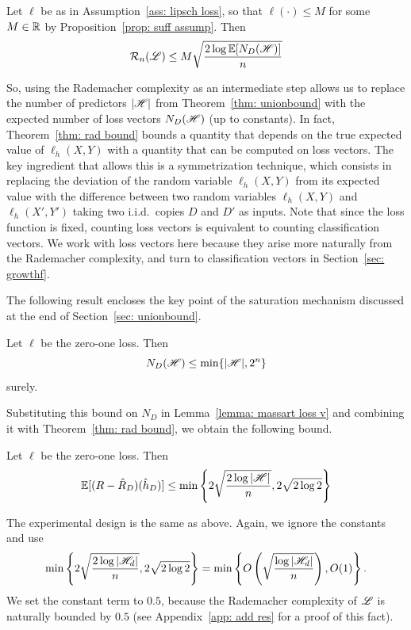 \documentclass[reqno]{amsart}
\begin{document}
\begin{lemma}\label{lemma: massart loss v}
Let $\ell$ be as in Assumption~\ref{ass: lipsch loss}, so that $\ell(\cdot) \le M$ for some $M\in\mathbb{R}$ by Proposition~\ref{prop: suff assump}. Then
\[
\mathcal R_n(\mathscr{L}) \le M\sqrt{\frac{2\log \mathbb{E}[N_D(\mathscr{H})]}{n}}
\]
\end{lemma}

So, using the Rademacher complexity as an intermediate step allows us to replace the number of predictors $\vert\mathscr{H}\vert$ from Theorem~\ref{thm: unionbound} with the expected number of loss vectors $N_D(\mathscr{H})$ (up to constants). 
In fact, Theorem~\ref{thm: rad bound} bounds a quantity that depends on the true expected value of $\ell_h(X,Y)$ with a quantity that can be computed on loss vectors. The key ingredient that allows this is a symmetrization technique, which consists in replacing the deviation of the random variable $\ell_h(X,Y)$ from its expected value with the difference between two random variables $\ell_h(X,Y)$ and $\ell_h(X',Y')$ taking two i.i.d.\ copies $D$ and $D'$ as inputs. Note that since the loss function is fixed, counting loss vectors is equivalent to counting classification vectors. We work with loss vectors here because they arise more naturally from the Rademacher complexity, and turn to classification vectors in Section~\ref{sec: growthf}. 

The following result encloses the key point of the saturation mechanism discussed at the end of Section~\ref{sec: unionbound}. 

\begin{lemma}[Counting]\label{lemma: counting} Let $\ell$ be the zero-one loss. Then
\[
N_{D}(\mathscr{H}) \le \min\{\vert\mathscr{H}\vert, 2^n\} 
\]
surely.
\end{lemma} 

Substituting this bound on $N_D$ in Lemma~\ref{lemma: massart loss v} and combining it with Theorem~\ref{thm: rad bound}, we obtain the following bound. 

\begin{theorem}\label{thm: rademmassart bound} Let $\ell$ be the zero-one loss. Then
\[
\mathbb{E}[(R-\hat R_D) (\hat h_D)]\le \min\left\{2\sqrt{\frac{2\log\vert\mathscr{H}\vert}{n}}, 2\sqrt{2\log 2}\right\} 
\]
\end{theorem}

The experimental design is the same as above. Again, we ignore the constants and use
\begin{equation}\label{eq: rademmassart bound}
\min\left\{2\sqrt{\frac{2\log\vert\mathscr{H}_d\vert}{n}}, 2\sqrt{2\log 2}\right\} = \min\left\{O\left(\sqrt\frac{\log\vert\mathscr{H}_d\vert}{n}\right), O(1)\right\}.
\end{equation}
We set the constant term to $0.5$, because the Rademacher complexity of $\mathscr{L}$ is naturally bounded by $0.5$ (see Appendix~\ref{app: add res} for a proof of this fact). 
\end{document}
